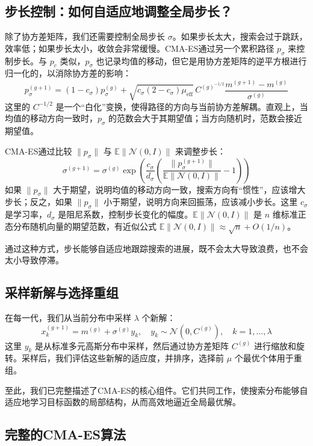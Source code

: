 \documentclass[lang=cn,zihao=-4,a4paper,fontset=windows]{beautybook}
\begin{document}
\subsection{步长控制：如何自适应地调整全局步长？}

除了协方差矩阵，我们还需要控制全局步长 \(\sigma\)。如果步长太大，搜索会过于跳跃，效率低；如果步长太小，收敛会非常缓慢。CMA-ES通过另一个累积路径 \(p_\sigma\) 来控制步长。与 \(p_c\) 类似，\(p_\sigma\) 也记录均值的移动，但它是用协方差矩阵的逆平方根进行归一化的，以消除协方差的影响：
\[
p_\sigma^{(g+1)} = (1 - c_\sigma) p_\sigma^{(g)} + \sqrt{c_\sigma(2 - c_\sigma)\mu_{\text{eff}}} \, C^{(g)^{-1/2}} \frac{m^{(g+1)} - m^{(g)}}{\sigma^{(g)}}
\]
这里的 \(C^{-1/2}\) 是一个“白化”变换，使得路径的方向与当前协方差解耦。直观上，当均值的移动方向一致时，\(p_\sigma\) 的范数会大于其期望值；当方向随机时，范数会接近期望值。

CMA-ES通过比较 \(\|p_\sigma\|\) 与 \(\mathbb{E}\|\mathcal{N}(0,I)\|\) 来调整步长：
\[
\sigma^{(g+1)} = \sigma^{(g)} \exp\left( \frac{c_\sigma}{d_\sigma} \left( \frac{\|p_\sigma^{(g+1)}\|}{\mathbb{E}\|\mathcal{N}(0,I)\|} - 1 \right) \right)
\]
如果 \(\|p_\sigma\|\) 大于期望，说明均值的移动方向一致，搜索方向有“惯性”，应该增大步长；反之，如果 \(\|p_\sigma\|\) 小于期望，说明方向来回振荡，应该减小步长。这里 \(c_\sigma\) 是学习率，\(d_\sigma\) 是阻尼系数，控制步长变化的幅度。\(\mathbb{E}\|\mathcal{N}(0,I)\|\) 是 \(n\) 维标准正态分布随机向量的期望范数，有近似公式 \(\mathbb{E}\|\mathcal{N}(0,I)\| \approx \sqrt{n} + O(1/n)\)。

通过这种方式，步长能够自适应地跟踪搜索的进展，既不会太大导致浪费，也不会太小导致停滞。

\subsection{采样新解与选择重组}

在每一代，我们从当前分布中采样 \(\lambda\) 个新解：
\[
x_k^{(g+1)} = m^{(g)} + \sigma^{(g)} y_k, \quad y_k \sim \mathcal{N}(0, C^{(g)}), \quad k=1,\dots,\lambda
\]
这里 \(y_k\) 是从标准多元高斯分布中采样，然后通过协方差矩阵 \(C^{(g)}\) 进行缩放和旋转。采样后，我们评估这些新解的适应度，并排序，选择前 \(\mu\) 个最优个体用于重组。

至此，我们已完整描述了CMA-ES的核心组件。它们共同工作，使搜索分布能够自适应地学习目标函数的局部结构，从而高效地逼近全局最优解。

\subsection{完整的CMA-ES算法}
\end{document}
